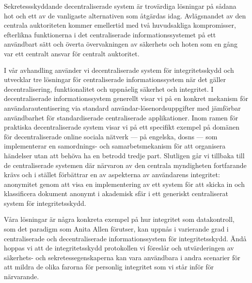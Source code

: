    Sekretessskyddande decentraliserade system är trovärdiga lösningar på sådana 
    hot och ett av de vanligaste alternativen som åtgärdas idag. Avlägsnandet av 
    den centrala auktoriteten kommer emellertid med två huvudsakliga kompromisser, 
    efterlikna funktionerna i det centraliserade informationssystemet 
    på ett användbart sätt och överta övervakningen av säkerhets och hoten som 
    en gång var ett centralt ansvar för centralt auktoritet.
    
    I vår avhandling använder vi decentraliserade system för integritetsskydd 
    och utvecklar tre lösningar för centraliserade informationssystem när det gäller 
    decentralisering, funktionalitet och uppnåelig säkerhet och integritet. I decentraliserade 
    informationssystem generellt visar vi på en konkret mekanism för användarautentisering 
    via standard användar-lösenordsuppgifter med jämförbar användbarhet för standardiserade 
    centraliserade applikationer. Inom ramen för praktiska decentraliserade system 
    visar vi på ett specifikt exempel på domänen för decentraliserade online sociala 
    nätverk --- på engelska, \aclp*{dosn} --- som implementerar en samordnings- 
    och samarbetsmekanism för att organisera händelser utan att behöva ha en betrodd 
    tredje part. Slutligen går vi tillbaka till de centraliserade systemen där närvaron 
    av den centrala myndigheten fortfarande krävs och i stället förbättrar en av 
    aspekterna av användarens integritet: anonymitet genom att visa en implementering 
    av ett system för att skicka in och klassificera dokument anonymt i akademisk 
    sfär i ett generiskt centraliserat system för integritetsskydd.
    
    Våra lösningar är några konkreta exempel på hur integritet som datakontroll, 
    som det paradigm som Anita Allen förutser, kan uppnås i varierande grad i centraliserade 
    och decentraliserade informationssystem för integritetsskydd. Ändå hoppas vi 
    att de integritetsskydd protokollen vi föreslår och utvärderingen av säkerhets- 
    och sekretessegenskaperna kan vara användbara i andra scenarier för att mildra 
    de olika farorna för personlig integritet som vi står inför för närvarande.

